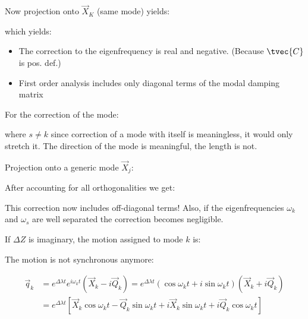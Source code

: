 \documentclass[10pt,a4paper]{scrartcl}
\begin{document}
\begin{multicols*}{2}
Now projection onto $\vec{X}_K$ (same mode) yields:


which yields:



\begin{itemize}
\item The correction to the eigenfrequency is real and negative. (Because $\tvec{C}$ is pos. def.)
\item First order analysis includes only diagonal terms of the modal damping matrix
\end{itemize}

For the correction of the mode:


where $s\neq k$ since correction of a mode with itself is meaningless, it would only stretch it. The direction of the mode is meaningful, the length is not.

Projection onto a generic mode $\vec{X}_j$:


After accounting for all orthogonalities we get:


This correction now includes off-diagonal terms! Also, if the eigenfrequencies $\omega_k$ and $\omega_s$ are well separated the correction becomes negligible.

If $\Delta Z$ is imaginary, the motion assigned to mode $k$ is:


The motion is not synchronous anymore:

\begin{align*}
\vec{q}_k&=e^{\Delta\lambda t}e^{i\omega_kt}(\vec{X}_k-i\vec{Q}_k)=e^{\Delta\lambda t}(\cos\omega_k t+i\sin\omega_k t)(\vec{X}_k+i\vec{Q}_k)\\
&=e^{\Delta\lambda t}[\vec{X}_k\cos\omega_k t-\vec{Q}_k\sin\omega_kt+i\vec{X}_k\sin\omega_kt+i\vec{Q}_k\cos\omega_k t]
\end{align*}


\end{multicols*}
\end{document}
